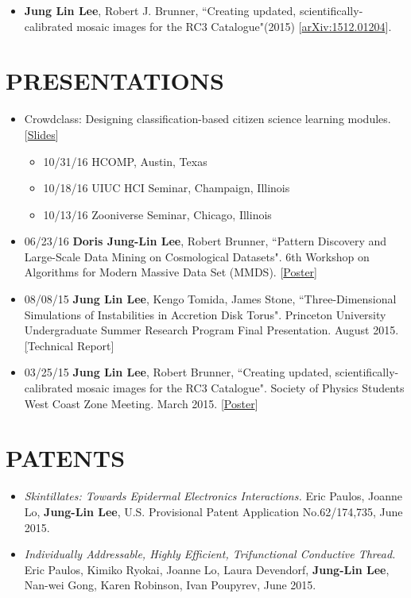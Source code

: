\documentclass{res}
\begin{document}
\begin{resume}
\begin{itemize}
\item \textbf{Jung Lin Lee}, Robert J. Brunner, ``Creating updated, scientifically-calibrated mosaic images for the RC3 Catalogue"(2015) [\href{http://arxiv.org/abs/1512.01204}{arXiv:1512.01204}]. 
\end{itemize}
\section{PRESENTATIONS}
\begin{itemize}
\item Crowdclass: Designing classification-based citizen science learning modules. [\href{http://dorisjunglinlee.com/files/crowdclass_slides.pdf}{Slides}]
	\begin{itemize}[label={$\circ$}]
	\item 10/31/16 HCOMP, Austin, Texas
	\item 10/18/16 UIUC HCI Seminar, Champaign, Illinois
	\item 10/13/16 Zooniverse Seminar, Chicago, Illinois
	\end{itemize}
\item 06/23/16 \textbf{Doris Jung-Lin Lee}, Robert Brunner, ``Pattern Discovery and Large-Scale Data Mining on Cosmological Datasets".  6th Workshop on Algorithms for Modern Massive Data Set (MMDS).  [\href{http://dorisjunglinlee.com/files/MMDS_poster.pdf}{Poster}]
\item 08/08/15 \textbf{Jung Lin Lee}, Kengo Tomida, James Stone, ``Three-Dimensional Simulations of Instabilities in Accretion Disk Torus". Princeton University Undergraduate Summer Research Program Final Presentation. August 2015. \href{http ://dorisjunglinlee.com/files/PrincetonUSRPreport.pdf}[{Technical Report}]
\item 03/25/15 \textbf{Jung Lin Lee}, Robert Brunner, ``Creating updated, scientifically-calibrated mosaic images for the RC3 Catalogue". Society of Physics Students West Coast Zone Meeting. March 2015. [\href{http://dorisjunglinlee.com/files/rc3_poster_sps_zone_meeting.pdf}{Poster}]
\end{itemize}
\section{PATENTS}
\begin{itemize}
\item \textit{Skintillates: Towards Epidermal Electronics Interactions.} Eric Paulos, Joanne Lo, \textbf{Jung-Lin Lee}, U.S. Provisional Patent Application No.62/174,735, June 2015.
\item \textit{Individually Addressable, Highly Efficient, Trifunctional Conductive Thread.} Eric Paulos, Kimiko Ryokai, Joanne Lo, Laura Devendorf, \textbf{Jung-Lin Lee}, Nan-wei Gong, Karen Robinson, Ivan Poupyrev, June 2015.
\end{itemize}

\end{resume}
\end{document}
